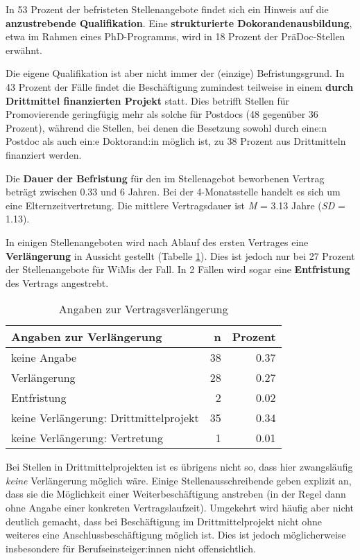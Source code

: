 \documentclass[
]{article}
\begin{document}
In 53 Prozent der befristeten Stellenangebote findet sich ein Hinweis auf die \textbf{anzustrebende Qualifikation}. Eine \textbf{strukturierte Dokorandenausbildung}, etwa im Rahmen eines PhD-Programms, wird in 18 Prozent der PräDoc-Stellen erwähnt.

Die eigene Qualifikation ist aber nicht immer der (einzige) Befristungsgrund. In 43 Prozent der Fälle findet die Beschäftigung zumindest teilweise in einem \textbf{durch Drittmittel finanzierten Projekt} statt. Dies betrifft Stellen für Promovierende geringfügig mehr als solche für Postdocs (48 gegenüber 36 Prozent), während die Stellen, bei denen die Besetzung sowohl durch eine:n Postdoc als auch ein:e Doktorand:in möglich ist, zu 38 Prozent aus Drittmitteln finanziert werden.

Die \textbf{Dauer der Befristung} für den im Stellenagebot beworbenen Vertrag beträgt zwischen 0.33 und 6 Jahren. Bei der 4-Monatsstelle handelt es sich um eine Elternzeitvertretung. Die mittlere Vertragsdauer ist \emph{M} = 3.13 Jahre (\emph{SD} = 1.13).

In einigen Stellenangeboten wird nach Ablauf des ersten Vertrages eine \textbf{Verlängerung} in Aussicht gestellt (Tabelle \ref{tab:limitextension}). Dies ist jedoch nur bei 27 Prozent der Stellenangebote für WiMis der Fall. In 2 Fällen wird sogar eine \textbf{Entfristung} des Vertrags angestrebt.

\begin{table}[H]

\caption{\label{tab:limitextension}Angaben zur Vertragsverlängerung}
\centering
\begin{tabular}[t]{l|r|r}
\hline
Angaben zur Verlängerung & n & Prozent\\
\hline
keine Angabe & 38 & 0.37\\
\hline
Verlängerung & 28 & 0.27\\
\hline
Entfristung & 2 & 0.02\\
\hline
keine Verlängerung: Drittmittelprojekt & 35 & 0.34\\
\hline
keine Verlängerung: Vertretung & 1 & 0.01\\
\hline
\end{tabular}
\end{table}

Bei Stellen in Drittmittelprojekten ist es übrigens nicht so, dass hier zwangsläufig \emph{keine} Verlängerung möglich wäre. Einige Stellenausschreibende geben explizit an, dass sie die Möglichkeit einer Weiterbeschäftigung anstreben (in der Regel dann ohne Angabe einer konkreten Vertragslaufzeit). Umgekehrt wird häufig aber nicht deutlich gemacht, dass bei Beschäftigung im Drittmittelprojekt nicht ohne weiteres eine Anschlussbeschäftigung möglich ist. Dies ist jedoch möglicherweise insbesondere für Berufseinsteiger:innen nicht offensichtlich.
\end{document}
